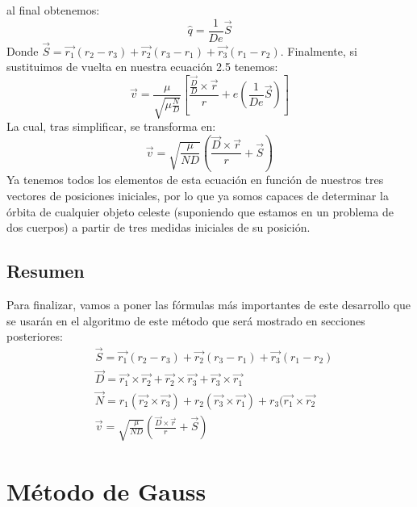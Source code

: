 \documentclass{article}
\numberwithin{equation}{section}
\begin{document}
al final obtenemos: 
\begin{equation}
    \hat{q}=\frac{1}{De}\overrightarrow{S} 
\end{equation}
Donde $\overrightarrow{S}=\overrightarrow{r_{1}}(r_{2}-r_{3})+\overrightarrow{r_{2}}(r_{3}-r_{1})+\overrightarrow{r_{3}}(r_{1}-r_{2})$. 
Finalmente, si sustituimos de vuelta en nuestra ecuación 2.5 tenemos: 
\begin{equation*}
    \overrightarrow{v}=\frac{\mu}{\sqrt{\mu\frac{N}{D}}}\left[\frac{\frac{\overrightarrow{D}}{D}\times\overrightarrow{r}}{r}+e\left(\frac{1}{De}\overrightarrow{S}\right) \right] 
\end{equation*}
La cual, tras simplificar, se transforma en: 
\begin{equation}
    \overrightarrow{v}=\sqrt{\frac{\mu}{ND}}\left(\frac{\overrightarrow{D}\times\overrightarrow{r}}{r}+\overrightarrow{S}\right) 
\end{equation}
Ya tenemos todos los elementos de esta ecuación en función de 
nuestros tres vectores de posiciones iniciales, por lo que 
ya somos capaces de determinar la órbita de cualquier 
objeto celeste (suponiendo que estamos en un problema de dos 
cuerpos) a partir de tres medidas iniciales de su posición. 
\subsection{Resumen}
Para finalizar, vamos a poner las fórmulas más importantes 
de este desarrollo que se usarán en el algoritmo de este 
método que será mostrado en secciones posteriores:
\begin{align*}
    &\overrightarrow{S}=\overrightarrow{r_{1}}(r_{2}-r_{3})+\overrightarrow{r_{2}}(r_{3}-r_{1})+\overrightarrow{r_{3}}(r_{1}-r_{2}) \\
    &\overrightarrow{D}=\overrightarrow{r_{1}}\times\overrightarrow{r_{2}}+\overrightarrow{r_{2}}\times\overrightarrow{r_{3}}+\overrightarrow{r_{3}}\times\overrightarrow{r_{1}} \\
    &\overrightarrow{N}=r_{1}(\overrightarrow{r_{2}}\times\overrightarrow{r_{3}})+r_{2}(\overrightarrow{r_{3}}\times\overrightarrow{r_{1}})+r_{3}(\overrightarrow{r_{1}}\times\overrightarrow{r_{2}} \\
    &\overrightarrow{v}=\sqrt{\frac{\mu}{ND}}\left(\frac{\overrightarrow{D}\times\overrightarrow{r}}{r}+\overrightarrow{S}\right) 
\end{align*}
\section{Método de Gauss}
\end{document}
